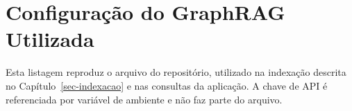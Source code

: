 \chapter{Configuração do GraphRAG Utilizada}
\label{sec-apendice-config}

Esta listagem reproduz o arquivo  do repositório, utilizado na indexação descrita no Capítulo~\ref{sec-indexacao} e nas consultas da aplicação. A chave de API é referenciada por variável de ambiente e não faz parte do arquivo.


